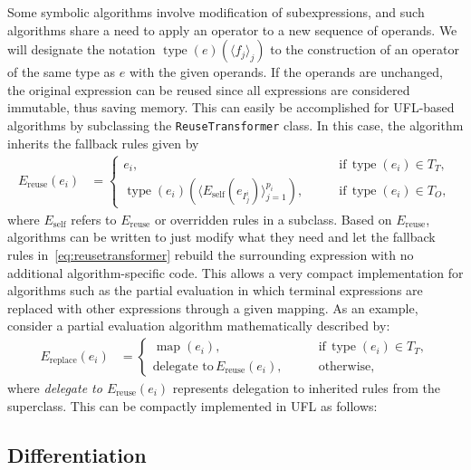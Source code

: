 \documentclass[prodmode,acmtoms]{acmsmall}
\newcommand{\uflc}[1]{\texttt{#1}}
\newcommand{\type}{\operatorname{type}}
\begin{document}
Some symbolic algorithms involve modification of subexpressions, and
such algorithms share a need to apply an operator to a new sequence of
operands. We will designate the notation $\type(e)(\langle f_j
\rangle_j)$ to the construction of an operator of the same type as $e$
with the given operands.  If the operands are unchanged, the original
expression can be reused since all expressions are considered
immutable, thus saving memory. This can easily be accomplished for
UFL-based algorithms by subclassing the \uflc{ReuseTransformer} class.
In this case, the algorithm inherits the fallback rules given by
\begin{align}
  \label{eq:reusetransformer}
  E_{\mathrm{reuse}}\left(e_i\right)
  &= \begin{cases}
    e_i,
    \qquad & \text{if} \, \type(e_i) \in T_T, \\
    \type(e_i)\left(\langle E_{\mathrm{self}}(e_{I_j^i}) \rangle_{j=1}^{p_i}\right),
    \qquad & \text{if} \, \type(e_i) \in T_O,
  \end{cases}
\end{align}
where $E_{\mathrm{self}}$ refers to $E_{\mathrm{reuse}}$ or overridden rules in a
subclass.  Based on $E_{\mathrm{reuse}}$, algorithms can be written to just
modify what they need and let the fallback rules
in~\eqref{eq:reusetransformer} rebuild the surrounding expression with
no additional algorithm-specific code.  This allows a very compact
implementation for algorithms such as the partial evaluation in which
terminal expressions are replaced with other expressions through a
given mapping. As an example, consider a partial evaluation algorithm
mathematically described by:
\begin{align}
  \label{eq:replacer}
  E_{\mathrm{replace}}\left(e_i\right)
  &= \begin{cases}
    \operatorname{map}(e_i),
    \qquad & \text{if} \, \type(e_i) \in T_T, \\
    \text{delegate to} \, E_{\mathrm{reuse}}(e_i),
    \qquad & \text{otherwise},
  \end{cases}
\end{align}
where \emph{delegate to $E_{\mathrm{reuse}}(e_i)$} represents
delegation to inherited rules from the superclass. This
can be compactly implemented in UFL as follows:

\subsection{Differentiation}
\label{sec:derivatives}
\end{document}

